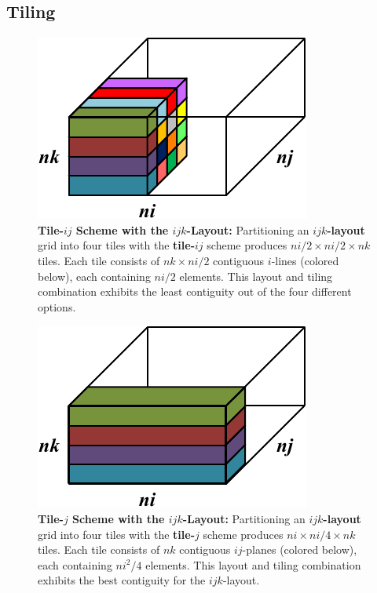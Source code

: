 \documentclass{sig-alternate-05-2015}
\begin{document}
\subsection{Tiling}
\label{sec:implementation:tiling}

\begin{figure}[!bt]
  \centering
  \caption{
    \textbf{Tile-\(ij\) Scheme with the \(ijk\)-Layout:}
    Partitioning an \textbf{\(ijk\)-layout} grid into four tiles with the
      \textbf{tile-\(ij\)} scheme produces \(ni/2 \times ni/2 \times nk\) tiles.
    Each tile consists of \(nk \times ni/2\) contiguous \(i\)-lines (colored
      below), each containing \(ni/2\) elements.
    This layout and tiling combination exhibits the least contiguity out of the
      four different options.
  }
  \label{fig:implementation:tiling:ijk_layout_tile_ij}
  \includegraphics[width=0.70\columnwidth]{figures/ijk_layout_tile_ij_scheme.pdf}
  \vspace{-.5cm}
\end{figure}

\begin{figure}[!bt]
  \centering
  \caption{
    \textbf{Tile-\(j\) Scheme with the \(ijk\)-Layout:}
    Partitioning an \textbf{\(ijk\)-layout} grid into four tiles with the
      \textbf{tile-\(j\)} scheme produces \(ni \times ni/4 \times nk\) tiles.
    Each tile consists of \(nk\) contiguous \(ij\)-planes (colored
      below), each containing \(ni^2/4\) elements.
    This layout and tiling combination exhibits the best contiguity for the 
      \(ijk\)-layout.
  }
  \label{fig:implementation:tiling:ijk_layout_tile_j}
  \includegraphics[width=0.70\columnwidth]{figures/ijk_layout_tile_j_scheme.pdf}
  \vspace{-.5cm}
\end{figure}
\end{document}
